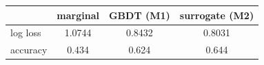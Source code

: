 \begin{tabular}{lccc}
\toprule
 & marginal & GBDT (M1) & surrogate (M2) \\
\midrule
log loss & 1.0744 & 0.8432 & 0.8031 \\
accuracy & 0.434 & 0.624 & 0.644 \\
\bottomrule
\end{tabular}

